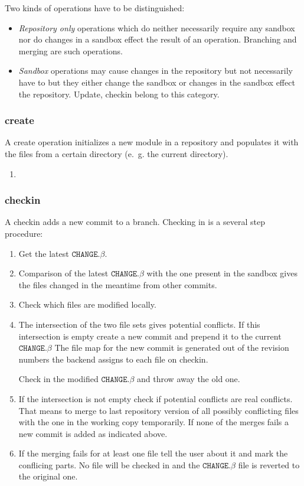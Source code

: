 \documentclass[fleqn, 10pt, a4paper]{report}
\begin{document}
Two kinds of operations have to be distinguished:
\begin{itemize}
\item \emph{Repository only} operations which do
neither necessarily require any sandbox nor do changes
in a sandbox effect the result of an operation.
Branching and merging are such operations.
\item \emph{Sandbox} operations may cause changes
in the repository but not necessarily have to but they
either change the sandbox or changes in the sandbox effect
the repository. Update, checkin belong to this category.
\end{itemize}


\subsubsection{create}

A create operation initializes a new module in a repository
and populates it with the files from a certain directory
(e.~g. the current directory).

\begin{enumerate}
\item 
\end{enumerate}

\subsubsection{checkin}

A checkin adds a new commit to a branch. Checking in is a
several step procedure:

\begin{enumerate}
\item Get the latest $\mathtt{CHANGE.}\beta$.
\item Comparison of the latest $\mathtt{CHANGE.}\beta$ with 
the one present in the sandbox gives the files changed
in the meantime from other commits.
\item Check which files are modified locally.
\item The intersection of the two file sets gives potential
conflicts. If this intersection is empty create a new commit
and prepend it to the current $\mathtt{CHANGE.}\beta$
The file map for the new commit is generated out of
the revision numbers the backend assigns to each file on
checkin.

Check in the modified $\mathtt{CHANGE.}\beta$ and throw
away the old one.
\item If the intersection is not empty check if potential
conflicts are real conflicts. That means to merge to last
repository version of all possibly conflicting files with 
the one in the working copy temporarily. If none of the merges
fails a new commit is added as indicated above.
\item If the merging fails for at least one file tell the user about
it and mark the conflicing parts. No file will be checked in and
the $\mathtt{CHANGE.}\beta$ file is reverted to the original one.
\end{enumerate}
\end{document}
